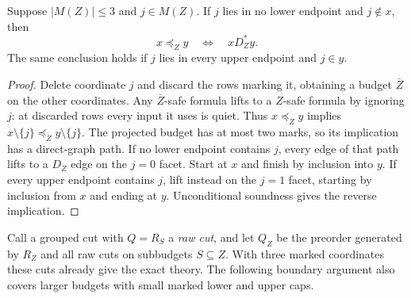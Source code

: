 \begin{corollary}
\label{core:cor:three-mark-endpoint-projection}
Suppose $|M(Z)|\leq3$ and $j\in M(Z)$. If $j$ lies in no lower endpoint
and $j\notin x$, then
\[
 x\preceq_Zy\quad\Longleftrightarrow\quad xD_Z^*y.
\]
The same conclusion holds if $j$ lies in every upper endpoint and
$j\in y$.
\end{corollary}
\begin{proof}
Delete coordinate $j$ and discard the rows marking it, obtaining a budget
$\bar Z$ on the other coordinates. Any $\bar Z$-safe formula lifts to a
$Z$-safe formula by ignoring $j$: at discarded rows every input it uses
is quiet. Thus $x\preceq_Zy$ implies
$x\setminus\{j\}\preceq_{\bar Z}y\setminus\{j\}$.
The projected budget has at most two marks, so its implication has a
direct-graph path. If no lower endpoint contains $j$, every edge of that
path lifts to a $D_Z$ edge on the $j=0$ facet. Start at $x$ and finish by
inclusion into $y$. If every upper endpoint contains $j$, lift instead
on the $j=1$ facet, starting by inclusion from $x$ and ending at $y$.
Unconditional soundness gives the reverse implication.
\end{proof}

Call a grouped cut with $Q=R_S$ a \emph{raw cut}, and let $Q_Z$ be the
preorder generated by $R_Z$ and all raw cuts on subbudgets $S\subseteq Z$.
With three marked coordinates these cuts already give the exact theory.
The following boundary argument also covers larger budgets with small
marked lower and upper caps.

